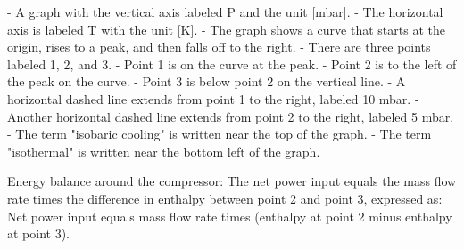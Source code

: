 - A graph with the vertical axis labeled P and the unit [mbar].
- The horizontal axis is labeled T with the unit [K].
- The graph shows a curve that starts at the origin, rises to a peak, and then falls off to the right.
- There are three points labeled 1, 2, and 3.
- Point 1 is on the curve at the peak.
- Point 2 is to the left of the peak on the curve.
- Point 3 is below point 2 on the vertical line.
- A horizontal dashed line extends from point 1 to the right, labeled 10 mbar.
- Another horizontal dashed line extends from point 2 to the right, labeled 5 mbar.
- The term "isobaric cooling" is written near the top of the graph.
- The term "isothermal" is written near the bottom left of the graph.

Energy balance around the compressor:
The net power input equals the mass flow rate times the difference in enthalpy between point 2 and point 3, expressed as:
Net power input equals mass flow rate times (enthalpy at point 2 minus enthalpy at point 3).